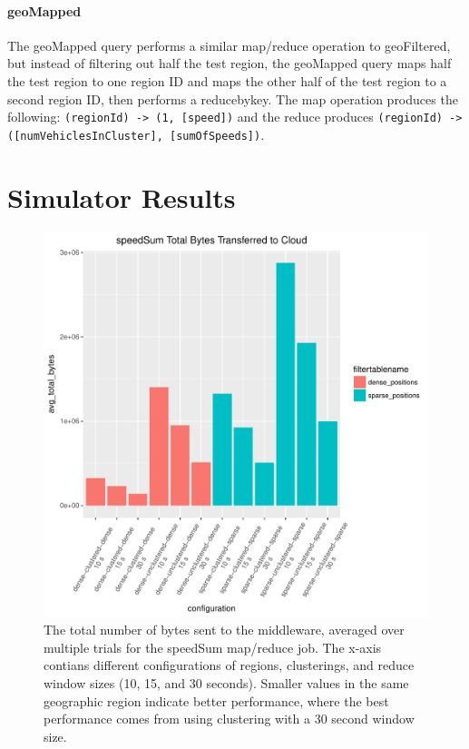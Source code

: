 \documentclass{thesis}
\begin{document}
    \paragraph{geoMapped}
        The geoMapped query performs a similar map/reduce operation to geoFiltered, but instead of filtering out half the
        test region, the geoMapped query maps half the test region to one region ID and maps the other half of the
        test region to a second region ID, then performs a reducebykey. The map operation produces the following:
        \verb|(regionId) -> (1, [speed])| and the reduce produces \verb|(regionId) -> ([numVehiclesInCluster], [sumOfSpeeds])|.

\section{Simulator Results}
    \begin{figure}
        \centering
        \includegraphics[scale=.8]{binImages/speedSum-runplot.pdf}
        \caption{The total number of bytes sent to the middleware,
        averaged over multiple trials for the speedSum map/reduce job. The x-axis contians different
        configurations of regions, clusterings, and reduce window sizes (10, 15, and 30 seconds). Smaller
        values in the same geographic region indicate better performance, where the best performance
        comes from using clustering with a 30 second window size.}
    \end{figure}
\end{document}
